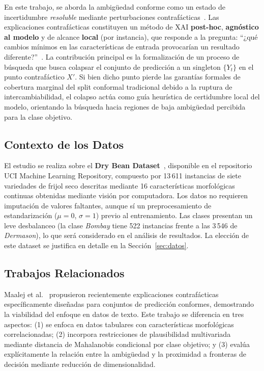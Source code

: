 \documentclass[conference]{IEEEtran}
\begin{document}
En este trabajo, se aborda la ambigüedad conforme como un estado de
incertidumbre \textit{resoluble} mediante perturbaciones contrafácticas~\cite{b4}.
Las explicaciones contrafácticas constituyen un método de XAI \textbf{post-hoc},
\textbf{agnóstico al modelo} y de alcance \textbf{local} (por instancia),
que responde a la pregunta: ``¿qué cambios mínimos en las características
de entrada provocarían un resultado diferente?''~\cite{b4,b7}. La
contribución principal es la formalización de un proceso de búsqueda que
busca colapsar el conjunto de predicción a un singleton $\{Y_t\}$ en el
punto contrafáctico $X'$. Si bien dicho punto pierde las garantías formales
de cobertura marginal del split conformal tradicional debido a la ruptura
de intercambiabilidad, el colapso actúa como guía heurística de certidumbre
local del modelo, orientando la búsqueda hacia regiones de baja ambigüedad
percibida para la clase objetivo.

\subsection{Contexto de los Datos}

El estudio se realiza sobre el \textbf{Dry Bean Dataset}~\cite{b5},
disponible en el repositorio UCI Machine Learning Repository, compuesto
por 13\,611 instancias de siete variedades de frijol seco descritas
mediante 16 características morfológicas continuas obtenidas mediante
visión por computadora. Los datos no requieren imputación de valores
faltantes, aunque sí un preprocesamiento de estandarización
($\mu = 0$, $\sigma = 1$) previo al entrenamiento. Las clases presentan un
leve desbalanceo (la clase \textit{Bombay} tiene 522 instancias frente
a las 3\,546 de \textit{Dermason}), lo que será considerado en el
análisis de resultados. La elección de este dataset se justifica en
detalle en la Sección~\ref{sec:datos}.

\subsection{Trabajos Relacionados}

Maalej et al.~\cite{b6} propusieron recientemente explicaciones
contrafácticas específicamente diseñadas para conjuntos de predicción
conformes, demostrando la viabilidad del enfoque en datos de texto. Este
trabajo se diferencia en tres aspectos: (1) se enfoca en datos tabulares
con características morfológicas correlacionadas; (2) incorpora
restricciones de plausibilidad multivariada mediante distancia de
Mahalanobis condicional por clase objetivo; y (3) evalúa explícitamente
la relación entre la ambigüedad y la proximidad a fronteras de decisión
mediante reducción de dimensionalidad.
\end{document}
